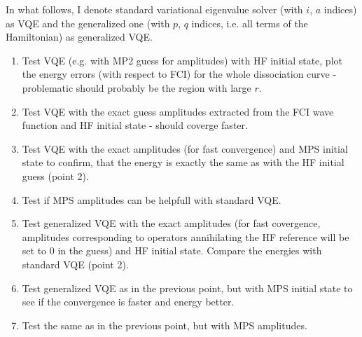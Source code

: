 \documentclass[pra,11pt]{revtex4-1}
\begin{document}
In what follows, I denote standard variational eigenvalue solver (with $i$, $a$ indices) as VQE and the generalized one (with $p$, $q$ indices, i.e. all terms of the Hamiltonian) as generalized VQE.

\begin{enumerate}
	\item Test VQE (e.g. with MP2 guess for amplitudes) with HF initial state, plot the energy errors (with respect to FCI) for the whole dissociation curve - problematic should probably be the region with large $r$.
	\item Test VQE with the exact guess amplitudes extracted from the FCI wave function and HF initial state - should coverge faster.
	\item Test VQE with the exact amplitudes (for fast convergence) and MPS initial state to confirm, that the energy is exactly the same as with the HF initial guess (point 2).
	\item Test if MPS amplitudes can be helpfull with standard VQE.
	\item Test generalized VQE with the exact amplitudes (for fast covergence, amplitudes corresponding to operators annihilating the HF reference will be set to $0$ in the guess) and HF initial state. Compare the energies with standard VQE (point 2).
	\item Test generalized VQE as in the previous point, but with MPS initial state to see if the convergence is faster and energy better.
	\item Test the same as in the previous point, but with MPS amplitudes.
\end{enumerate}
\end{document}
